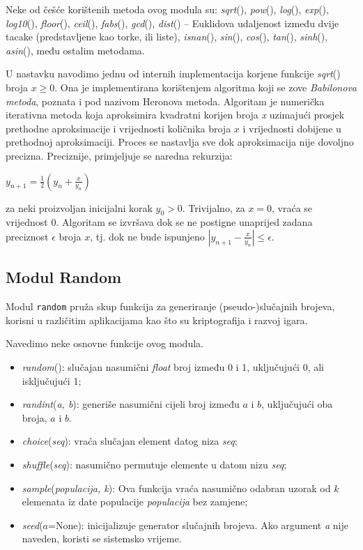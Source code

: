 Neke od češće korištenih metoda ovog modula su:   \textit{sqrt}(), \textit{pow}(), \textit{log}(), \textit{exp}(), \textit{log10}(), \textit{floor}(), \textit{ceil}(), \textit{fabs}(), \textit{gcd}(), \textit{dist}() – Euklidova udaljenost između dvije tacake (predstavljene kao torke, ili liste), \textit{isnan}(), \textit{sin}(), \textit{cos}(), \textit{tan}(), \textit{sinh}(), \textit{asin}(), među ostalim metodama.

U nastavku navodimo jednu od internih implementacija korjene funkcije \textit{sqrt}() broja $x\geq 0$. Ona je implementirana  korištenjem algoritma koji se zove \textit{Babilonova metoda}, poznata i pod nazivom Heronova metoda. Algoritam je numerička iterativna metoda koja aproksimira kvadratni korijen broja \textit{x} uzimajući prosjek prethodne aproksimacije i vrijednosti količnika broja $x$ i vrijednosti dobijene u prethodnoj aproksimaciji. Proces se nastavlja sve dok aproksimacija nije dovoljno precizna. Preciznije, primjeljuje se naredna rekurzija:
\begin{center}
	$y_{n+1}= \frac{1}{2}(y_n + \frac{x}{y_n})$
\end{center}
za neki proizvoljan inicijalni korak $y_0> 0$. Trivijalno, za $x=0$, vraća se vrijednost 0. Algoritam se izvršava dok se ne postigne unaprijed zadana preciznost $\epsilon$ broja $x$, tj. dok ne bude ispunjeno $|y_{n+1} - \frac{x}{y_n}| \leq \epsilon$. 
\subsection{Modul Random}

Modul \texttt{random}  pruža skup funkcija za generiranje (pseudo-)slučajnih brojeva,   korisni u različitim aplikacijama kao što su  kriptografija i razvoj igara.

Navedimo neke osnovne funkcije ovog modula.

\begin{itemize}
	\item   \textit{random}():  slučajan nasumični \textit{float} broj između 0 i 1, uključujući 0, ali isključujući 1;
	\item \textit{randint}(\emph{a, b}):  generiše nasumični cijeli broj između $a$ i $b$, uključujući oba broja,  $a$ i $b$.
	\item  \textit{choice}(\emph{seq}):  vraća slučajan element datog niza \textit{seq}; 
	\item \textit{shuffle}(\emph{seq}): nasumično permutuje elemente u datom nizu \textit{seq};
	\item \textit{sample}(\emph{populacija, k}): Ova funkcija vraća nasumično odabran uzorak od $k$ elemenata iz date populacije  \textit{populacija} bez zamjene;
	\item \textit{seed}($a$=None): inicijalizuje generator slučajnih brojeva. Ako argument \textit{a} nije naveden, koristi se sistemsko vrijeme.
 
\end{itemize}

